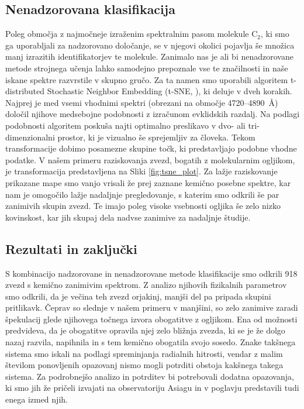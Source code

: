 \subsection{Nenadzorovana klasifikacija}
Poleg območja z najmočneje izraženim spektralnim pasom molekule C$_{2}$, ki smo ga uporabljali za nadzorovano določanje, se v njegovi okolici pojavlja še množica manj izrazitih identifikatorjev te molekule. Zanimalo nas je ali bi nenadzorovane metode strojnega učenja lahko samodejno prepoznale vse te značilnosti in naše iskane spektre razvrstile v skupno gručo. Za ta namen smo uporabili algoritem t-distributed Stochastic Neighbor Embedding (t-SNE, \cite{van2008visualizing}), ki deluje v dveh korakih. Najprej je med vsemi vhodnimi spektri (obrezani na območje 4720--4890~\AA) določil njihove medsebojne podobnosti z izračunom evklidskih razdalj. Na podlagi podobnosti algoritem poskuša najti optimalno preslikavo v dvo- ali tri-dimenzionalni prostor, ki je vizualno še sprejemljiv za človeka. Tekom transformacije dobimo posamezne skupine točk, ki predstavljajo podobne vhodne podatke. V našem primeru raziskovanja zvezd, bogatih z molekularnim ogljikom, je transformacija predstavljena na Sliki \ref{fig:tsne_plot}. Za lažje raziskovanje prikazane mape smo vanjo vrisali že prej zaznane kemično posebne spektre, kar nam je omogočilo lažje nadaljnje pregledovanje, s katerim smo odkrili še par zanimivih skupin zvezd. Te imajo poleg visoke vsebnosti ogljika še zelo nizko kovinskost, kar jih skupaj dela nadvse zanimive za nadaljnje študije.

\subsection{Rezultati in zaključki}
S kombinacijo nadzorovane in nenadzorovane metode klasifikacije smo odkrili 918 zvezd s kemično zanimivim spektrom. Z analizo njihovih fizikalnih parametrov smo odkrili, da je večina teh zvezd orjakinj, manjši del pa pripada skupini pritlikavk. Čeprav so slednje v našem primeru v manjšini, so zelo zanimive zaradi špekulacij glede njihovega točnega izvora obogatitve z ogljikom. Ena od možnosti predvideva, da je obogatitve opravila njej zelo bližnja zvezda, ki se je že dolgo nazaj razvila, napihnila in s tem kemično obogatila svojo sosedo. Znake takšnega sistema smo iskali na podlagi spreminjanja radialnih hitrosti, vendar z malim številom ponovljenih opazovanj nismo mogli potrditi obstoja kakšnega takega sistema. Za podrobnejšo analizo in potrditev bi potrebovali dodatna opazovanja, ki smo jih že pričeli izvajati na observatoriju Asiagu in v poglavju predstavili tudi enega izmed njih.

